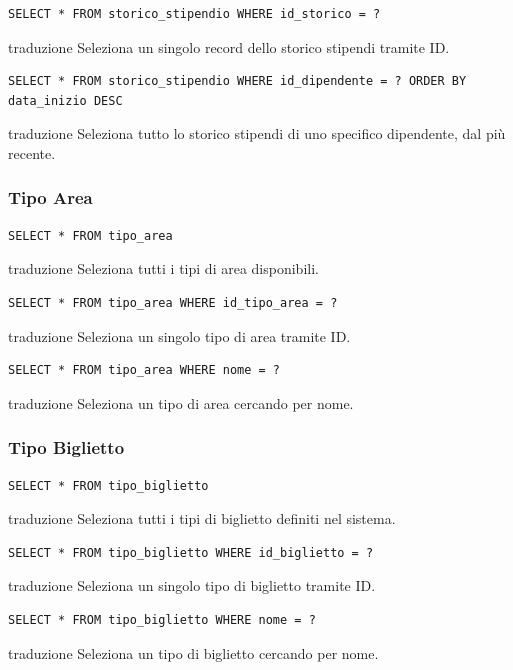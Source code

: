 \documentclass[12pt,a4paper]{report}
\begin{document}
\begin{lstlisting}[style=sqlstyle]
SELECT * FROM storico_stipendio WHERE id_storico = ?
\end{lstlisting}
traduzione {Seleziona un singolo record dello storico stipendi tramite ID.}

\begin{lstlisting}[style=sqlstyle]
SELECT * FROM storico_stipendio WHERE id_dipendente = ? ORDER BY data_inizio DESC
\end{lstlisting}
traduzione {Seleziona tutto lo storico stipendi di uno specifico dipendente, dal più recente.}

\subsubsection*{Tipo Area}
\begin{lstlisting}[style=sqlstyle]
SELECT * FROM tipo_area
\end{lstlisting}
traduzione {Seleziona tutti i tipi di area disponibili.}

\begin{lstlisting}[style=sqlstyle]
SELECT * FROM tipo_area WHERE id_tipo_area = ?
\end{lstlisting}
traduzione {Seleziona un singolo tipo di area tramite ID.}

\begin{lstlisting}[style=sqlstyle]
SELECT * FROM tipo_area WHERE nome = ?
\end{lstlisting}
traduzione {Seleziona un tipo di area cercando per nome.}

\subsubsection*{Tipo Biglietto}
\begin{lstlisting}[style=sqlstyle]
SELECT * FROM tipo_biglietto
\end{lstlisting}
traduzione {Seleziona tutti i tipi di biglietto definiti nel sistema.}

\begin{lstlisting}[style=sqlstyle]
SELECT * FROM tipo_biglietto WHERE id_biglietto = ?
\end{lstlisting}
traduzione {Seleziona un singolo tipo di biglietto tramite ID.}

\begin{lstlisting}[style=sqlstyle]
SELECT * FROM tipo_biglietto WHERE nome = ?
\end{lstlisting}
traduzione {Seleziona un tipo di biglietto cercando per nome.}
\end{document}
